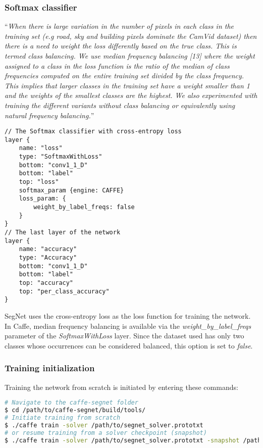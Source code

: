 \newpage
\subsubsection{Softmax classifier}

\enquote{\textit{When there is large variation in the number of
	pixels in each class in the training set (e.g road, sky and building
	pixels dominate the CamVid dataset) then there is a need to weight
	the loss differently based on the true class. This is termed class
	balancing. We use median frequency balancing [13] where the
	weight assigned to a class in the loss function is the ratio of the
	median of class frequencies computed on the entire training set
	divided by the class frequency. This implies that larger classes in
	the training set have a weight smaller than 1 and the weights
	of the smallest classes are the highest. We also experimented
	with training the different variants without class balancing or
	equivalently using natural frequency balancing.}} \cite{segnet}

\begin{lstlisting}[caption={Output layers of \textit{train.prototxt} \cite{filip_github}},captionpos=b]
// The Softmax classifier with cross-entropy loss
layer {
	name: "loss"
	type: "SoftmaxWithLoss"
	bottom: "conv1_1_D"
	bottom: "label"
	top: "loss"
	softmax_param {engine: CAFFE}
	loss_param: {
		weight_by_label_freqs: false	     
	}
}
// The last layer of the network
layer {
	name: "accuracy"
	type: "Accuracy"
	bottom: "conv1_1_D"
	bottom: "label"
	top: "accuracy"
	top: "per_class_accuracy"
}
\end{lstlisting}


SegNet uses the cross-entropy loss as the loss function for training the network. In Caffe, median frequency balancing is available via the \textit{weight\_by\_label\_freqs} parameter of the \textit{SoftmaxWithLoss} layer. Since the dataset used has only two classes whose occurrences can be considered balanced, this option is set to \textit{false}. 

\subsubsection{Training initialization}

\noindent Training the network from scratch is initiated by entering these commands:

\begin{lstlisting}[language=bash]
# Navigate to the caffe-segnet folder
$ cd /path/to/caffe-segnet/build/tools/
# Initiate training from scratch
$ ./caffe train -solver /path/to/segnet_solver.prototxt
# or resume training from a solver checkpoint (snapshot)
$ ./caffe train -solver /path/to/segnet_solver.prototxt -snapshot /path/to/snapshot_iter_XY.solverstate
\end{lstlisting}

